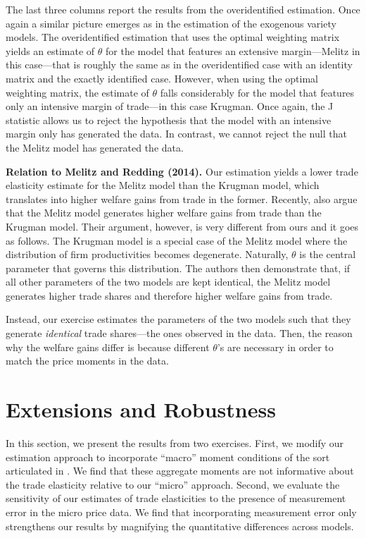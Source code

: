 \documentclass[12pt,dvips, ps2pdf]{article}
\begin{document}
The last three columns report the results from the overidentified estimation. Once again a similar picture emerges as in the estimation of the exogenous variety models. The overidentified estimation that uses the optimal weighting matrix yields an estimate of $\theta$ for the model that features an extensive margin---Melitz in this case---that is roughly the same as in the overidentified case with an identity matrix and the exactly identified case. However, when using the optimal weighting matrix, the estimate of $\theta$ falls considerably for the model that features only an intensive margin of trade---in this case Krugman. Once again, the J statistic allows us to reject the hypothesis that the model with an intensive margin only has generated the data. In contrast, we cannot reject the null that the Melitz model has generated the data.


\textbf{Relation to Melitz and Redding (2014).} Our estimation yields a lower trade elasticity estimate for the Melitz model than the Krugman model, which translates into higher welfare gains from trade in the former. Recently, \citet{melitz_redding} also argue that the Melitz model generates higher welfare gains from trade than the Krugman model. Their argument, however, is very different from ours and it goes as follows. The Krugman model is a special case of the Melitz model where the distribution of firm productivities becomes degenerate. Naturally, $\theta$ is the central parameter that governs this distribution. The authors then demonstrate that, if all other parameters of the two models are kept identical, the Melitz model generates higher trade shares and therefore higher welfare gains from trade.

Instead, our exercise estimates the parameters of the two models such that they generate \emph{identical} trade shares---the ones observed in the data. Then, the reason why the welfare gains differ is because different $\theta$'s are necessary in order to match the price moments in the data.

\section{Extensions and Robustness}

In this section, we present the results from two exercises. First, we modify our estimation approach to incorporate ``macro'' moment conditions of the sort articulated in \citet{acr09}. We find that these aggregate moments are not informative about the trade elasticity relative to our ``micro'' approach. Second, we evaluate the sensitivity of our estimates of trade elasticities to the presence of measurement error in the micro price data. We find that incorporating measurement error only strengthens our results by magnifying the quantitative differences across models.
\end{document}
